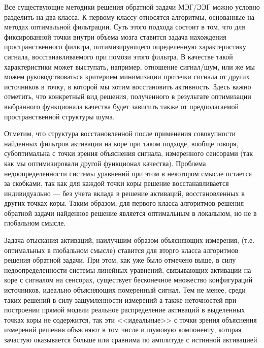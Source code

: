 Все существующие методики решения обратной задачи МЭГ/ЭЭГ можно условно разделить на два класса.
К первому классу относятся алгоритмы, основанные на методах оптимальной фильтрации.
Суть этого подхода состоит в том, что для фиксированной точки внутри объема мозга ставится задача нахождения
пространственного фильтра, оптимизирующего определенную характеристику сигнала,
восстанавливаемого при помози этого фильтра.
В качестве такой характеристики может выступать, например, отношение сигнал/шум,
или же мы можем руководствоваться критерием минимизации протечки сигнала от других источников в точку,
в которой мы хотим восстановить активность.
Здесь важно отметить, что конкретный вид решения, полученного в результате оптимизации выбранного
функционала качества будет зависить также от предполагаемой пространственной структуры шума.

Отметим, что структура восстановленной после применения совокупности найденных
фильтров активации на коре при таком подходе, вообще говоря, субоптимальна с
точки зрения объяснения сигнала, измеренного сенсорами (так как мы
оптимизировали другой функционал качества).  Проблема недоопределенности
системы уравнений при этом в некотором смысле остается за скобками, так как для
каждой точки коры решение восстанавливается индивидуально --- без учета вклада
в решение активаций, восстановленных в других точках коры.  Таким образом, для
первого класса алгоритмов решения обратной задачи найденное решение является
оптимальным в локальном, но не в глобальном смысле.

Задача отыскания активаций, наилучшим образом объясняющих измерения, (т.е.
оптимальных в глобальном смысле) ставится для вторго класса алгоритмов решения
обратной задачи.  При этом, как уже было отмечено выше, в силу
недоопределенности системы линейных уравнений, связывающих активации на коре с
сигналом на сенсорах, существует бесконечное множество конфигураций источников,
идеально объясняющих померенный сигнал.  Тем не менее, среди таких решений в
силу зашумленности измерений а также неточностей при построении прямой модели
реальное распределение активаций в выделенных точках коры не содержится, так
эти <<идеальные>> с точки зрения объяснения измерений решения объясняют в том
числе и шумовую компоненту, которая зачастую оказывается больше или сравнима по
амплитуде с истинной активацией.

